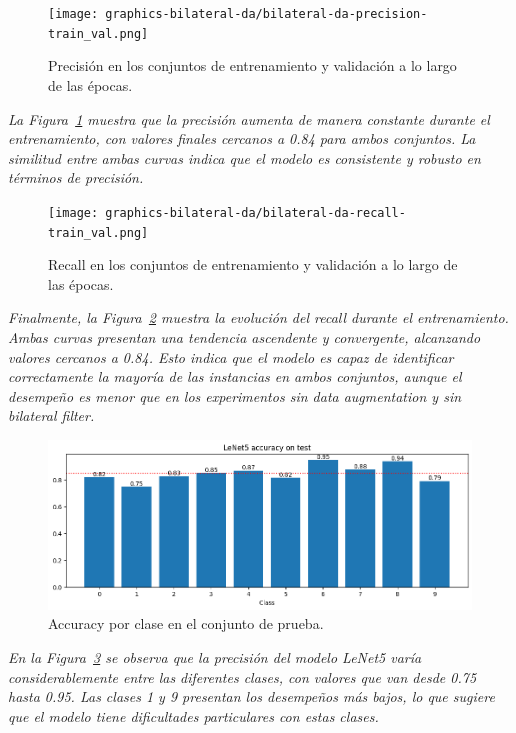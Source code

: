 \documentclass[conference]{IEEEtran}
\begin{document}
\begin{figure}[H]
    \centering
    \texttt{[image: graphics-bilateral-da/bilateral-da-precision-train\_val.png]}
    \caption{Precisión en los conjuntos de entrenamiento y validación a lo largo de las épocas.}
    \label{fig:bilateral-da-precision-train_val}
\end{figure}
\noindent\textit{
La Figura~\ref{fig:bilateral-da-precision-train_val} muestra que la precisión aumenta de manera constante durante el entrenamiento, con valores finales cercanos a 0.84 para ambos conjuntos. La similitud entre ambas curvas indica que el modelo es consistente y robusto en términos de precisión.
}

\begin{figure}[H]
    \centering
    \texttt{[image: graphics-bilateral-da/bilateral-da-recall-train\_val.png]}
    \caption{Recall en los conjuntos de entrenamiento y validación a lo largo de las épocas.}
    \label{fig:bilateral-da-recall-train_val}
\end{figure}
\noindent\textit{
Finalmente, la Figura~\ref{fig:bilateral-da-recall-train_val} muestra la evolución del recall durante el entrenamiento. Ambas curvas presentan una tendencia ascendente y convergente, alcanzando valores cercanos a 0.84. Esto indica que el modelo es capaz de identificar correctamente la mayoría de las instancias en ambos conjuntos, aunque el desempeño es menor que en los experimentos sin data augmentation y sin bilateral filter.
}


\begin{figure}[H]
    \centering
    \includegraphics[width=0.95\linewidth]{graphics-bilateral-da/bilateral-da-accuracy-test.png}
    \caption{Accuracy por clase en el conjunto de prueba.}
    \label{fig:bilateral-da-accuracy-test}
\end{figure}
\noindent\textit{
En la Figura~\ref{fig:bilateral-da-accuracy-test} se observa que la precisión del modelo LeNet5 varía considerablemente entre las diferentes clases, con valores que van desde 0.75 hasta 0.95. Las clases 1 y 9 presentan los desempeños más bajos, lo que sugiere que el modelo tiene dificultades particulares con estas clases.
}
\end{document}
